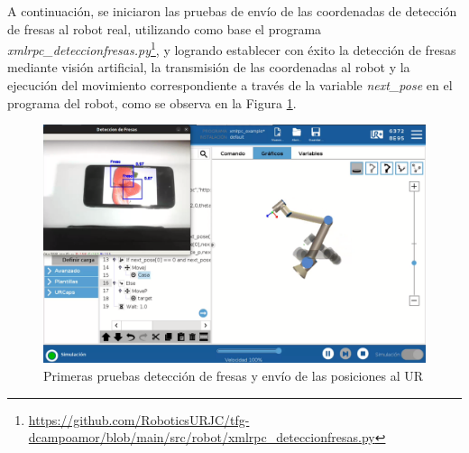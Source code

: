A continuación, se iniciaron las pruebas de envío de las coordenadas de detección de fresas al robot real, utilizando como base el programa \textit{xmlrpc\_deteccionfresas.py}\footnote{\url{https://github.com/RoboticsURJC/tfg-dcampoamor/blob/main/src/robot/xmlrpc_deteccionfresas.py}}, y logrando establecer con éxito la detección de fresas mediante visión artificial, la transmisión de las coordenadas al robot y la ejecución del movimiento correspondiente a través de la variable \textit{next\_pose} en el programa del robot, como se observa en la Figura \ref{fig:primeraspruebas_fresas_UR}.

  \begin{figure}[H]
     \centering
     \begin{center}
       \includegraphics[width=155mm]{figs/Primeras pruebas deteccion de fresas y envio de posiciones a UR.png}
     \end{center}
     \caption{Primeras pruebas detección de fresas y envío de las posiciones al UR}
     \label{fig:primeraspruebas_fresas_UR}
  \end{figure}

